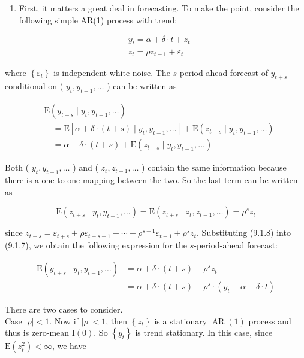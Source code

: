\documentclass[10pt]{article}
\begin{document}
\begin{enumerate}
  \item First, it matters a great deal in forecasting. To make the point, consider the following simple AR(1) process with trend:
\end{enumerate}


\begin{align*}
& y_{t}=\alpha+\delta \cdot t+z_{t} \\
& z_{t}=\rho z_{t-1}+\varepsilon_{t} \tag{9.1.6}
\end{align*}


where $\left\{\varepsilon_{t}\right\}$ is independent white noise. The $s$-period-ahead forecast of $y_{t+s}$ conditional on ( $y_{t}, y_{t-1}, \ldots$ ) can be written as


\begin{align*}
& \mathrm{E}\left(y_{t+s} \mid y_{t}, y_{t-1}, \ldots\right) \\
& \quad=\mathrm{E}\left[\alpha+\delta \cdot(t+s) \mid y_{t}, y_{t-1}, \ldots\right]+\mathrm{E}\left(z_{t+s} \mid y_{t}, y_{t-1}, \ldots\right) \\
& \quad=\alpha+\delta \cdot(t+s)+\mathrm{E}\left(z_{t+s} \mid y_{t}, y_{t-1}, \ldots\right) \tag{9.1.7}
\end{align*}


Both ( $y_{t}, y_{t-1}, \ldots$ ) and ( $z_{t}, z_{t-1}, \ldots$ ) contain the same information because there is a one-to-one mapping between the two. So the last term can be written as


\begin{equation*}
\mathrm{E}\left(z_{t+s} \mid y_{t}, y_{t-1}, \ldots\right)=\mathrm{E}\left(z_{t+s} \mid z_{t}, z_{t-1}, \ldots\right)=\rho^{s} z_{t} \tag{9.1.8}
\end{equation*}


since $z_{t+s}=\varepsilon_{t+s}+\rho \varepsilon_{t+s-1}+\cdots+\rho^{s-1} \varepsilon_{t+1}+\rho^{s} z_{t}$. Substituting (9.1.8) into (9.1.7), we obtain the following expression for the $s$-period-ahead forecast:


\begin{align*}
\mathrm{E}\left(y_{t+s} \mid y_{t}, y_{t-1}, \ldots\right) & =\alpha+\delta \cdot(t+s)+\rho^{s} z_{t} \\
& =\alpha+\delta \cdot(t+s)+\rho^{s} \cdot\left(y_{t}-\alpha-\delta \cdot t\right) \tag{9.1.9}
\end{align*}


There are two cases to consider.\\
Case $|\rho|<1$. Now if $|\rho|<1$, then $\left\{z_{t}\right\}$ is a stationary $\operatorname{AR}(1)$ process and thus is zero-mean $\mathrm{I}(0)$. So $\left\{y_{t}\right\}$ is trend stationary. In this case, since $\mathrm{E}\left(z_{t}^{2}\right)<\infty$, we have
\end{document}
